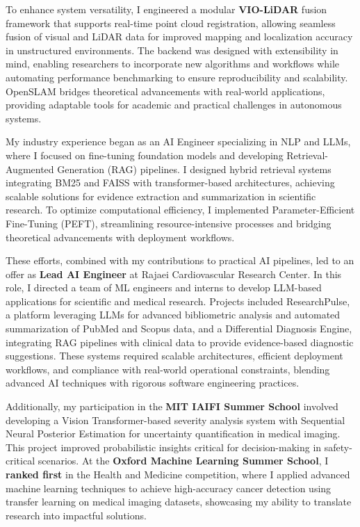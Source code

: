 \documentclass[12pt]{article}
\begin{document}
To enhance system versatility, I engineered a modular \textbf{VIO-LiDAR} fusion framework that supports real-time point cloud registration, allowing seamless fusion of visual and LiDAR data for improved mapping and localization accuracy in unstructured environments. The backend was designed with extensibility in mind, enabling researchers to incorporate new algorithms and workflows while automating performance benchmarking to ensure reproducibility and scalability. OpenSLAM bridges theoretical advancements with real-world applications, providing adaptable tools for academic and practical challenges in autonomous systems.

My industry experience began as an AI Engineer specializing in NLP and LLMs, where I focused on fine-tuning foundation models and developing Retrieval-Augmented Generation (RAG) pipelines. I designed hybrid retrieval systems integrating BM25 and FAISS with transformer-based architectures, achieving scalable solutions for evidence extraction and summarization in scientific research. To optimize computational efficiency, I implemented Parameter-Efficient Fine-Tuning (PEFT), streamlining resource-intensive processes and bridging theoretical advancements with deployment workflows. 


These efforts, combined with my contributions to practical AI pipelines, led to an offer as \textbf{Lead AI Engineer} at Rajaei Cardiovascular Research Center. In this role, I directed a team of ML engineers and interns to develop LLM-based applications for scientific and medical research. Projects included ResearchPulse, a platform leveraging LLMs for advanced bibliometric analysis and automated summarization of PubMed and Scopus data, and a Differential Diagnosis Engine, integrating RAG pipelines with clinical data to provide evidence-based diagnostic suggestions. These systems required scalable architectures, efficient deployment workflows, and compliance with real-world operational constraints, blending advanced AI techniques with rigorous software engineering practices. 

Additionally, my participation in the \textbf{MIT IAIFI Summer School} involved developing a Vision Transformer-based severity analysis system with Sequential Neural Posterior Estimation for uncertainty quantification in medical imaging. This project improved probabilistic insights critical for decision-making in safety-critical scenarios. At the \textbf{Oxford Machine Learning Summer School}, I \textbf{ranked first} in the Health and Medicine competition, where I applied advanced machine learning techniques to achieve high-accuracy cancer detection using transfer learning on medical imaging datasets, showcasing my ability to translate research into impactful solutions.
\end{document}
